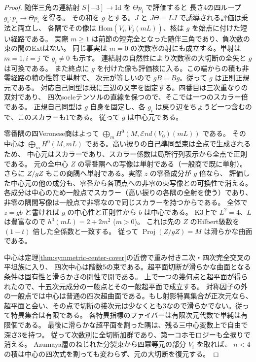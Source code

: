 \begin{proof}
随伴三角の連結射 $S[-3]\to\mathrm{Id}$ を $\Theta p_i$ で評価すると
長さ4の四ループ $g_i:p_i\to\Theta p_i$ を得る。
その和を $g$ とする。$J$ と $J\Theta=LJ$ で誘導される評価は乗法と両立し、
各隅でその像は $\mathrm{Hom}(V_i,V_j(mL))$、核は $g$ を始点に付けた短い経路である。
実際 $m\ge1$ は前節の短完全となった随伴三角であり、負次数の束の間のExtはない。
同じ事実は $m=0$ の次数零の射にも成立する。単射は $m=1,i=j$ で $g_i\ne0$ も示す。
連結射の自然性により次数零の大切断の全矢と $g$ は可換である。
また終点に $g$ を付けた像も評価核に入る。この端からの積も非零経路の積の性質で単射で、
次元が等しいので $gB=Bg$。従って $g$ は正則正規元である。
対応自己同型は既に三辺の文字を固定する。四番目は三次重なりの双対であり、
四次socleテンソルの直線を保つので、そこでは一つのスカラー倍である。
正規自己同型は $g$ 自身を固定し、各 $g_i$ は戻り辺をちょうど一つ含むので、このスカラーも1である。
従って $g$ は中心元である。

零番隅の四Veronese商はよって $\bigoplus_m H^0(M,\mathcal End(V_0)(mL))$ である。
その中心は $\bigoplus_m H^0(M,mL)$ である。高い捩りの自己準同型束は全点で生成されるため、
中心元はスカラーであり、スカラー係数は局所行列表示から全点で正則である。
元の全中心 $Z$ の零番隅への写像は単射である（一般商で既に単射）。
さらに $Z/gZ$ もこの商隅へ単射である。実際 $z$ の零番成分が $g$ 倍なら、
評価した中心元の他の成分も、零番から各頂点への非零の束写像との可換性で消える。
各成分は中心のため一般点でスカラー（高い捩りの各隅の全射を使う）であり、
非零の隅間写像は一般点で非零なので同じスカラーを持つからである。
全体で $z=gb$ と書ければ $g$ の中心性と正則性から $b$ は中心である。
K3上で $L^2=4$、$L$ は豊富なので $h^0(mL)=2+2m^2$ ($m>0$)。
これは先の $Z$ のHilbert級数を $(1-t)$ 倍した全係数と一致する。
従って $\operatorname{Proj}(Z/gZ)=M$ は滑らかな曲面である。

中心は定理\ref{thm:symmetric-center-cover}の近傍で重み付き二次・四次完全交叉の平坦族に入り、
四次中心は階数5の束である。超平面切断が滑らかな曲面となる条件は固有性と滑らかさの開性で開である。
上で一つの幾何点と超平面が得られたので、十五次元成分の一般点とその一般超平面で成立する。
対称因子の外の一般点では中心は普通の四次超曲面である。もし射影特異集合が正次元なら、
超平面と会い、その点で切断の接次元は少なくとも3なので滑らかでない。従って特異集合は有限である。
各特異指標のファイバーは有限次元代数で単純は有限個である。
最後に滑らかな超平面を割った隅は、残る三中心変数上で自由で深さ3を持つ。
従って次数別に全切断加群であり、第一コホモロジーも全捩りで消える。
Azumaya層のねじれた分裂束から四冪等元の部分 $V_i$ を取れば、
$n<4$ の積は中心の四次式を割っても変わらず、元の大切断を復元する。
\end{proof}

